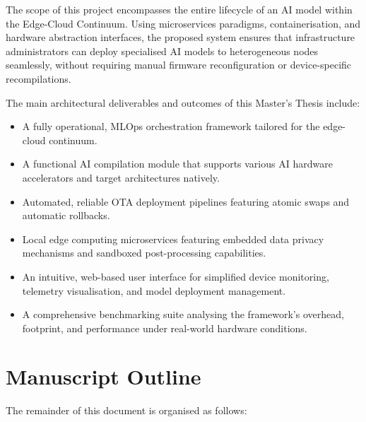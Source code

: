 The scope of this project encompasses the entire lifecycle of an \gls{AI} model within the Edge-Cloud Continuum. Using microservices paradigms, containerisation, and hardware abstraction interfaces, the proposed system ensures that infrastructure administrators can deploy specialised \gls{AI} models to heterogeneous nodes seamlessly, without requiring manual firmware reconfiguration or device-specific recompilations.

The main architectural deliverables and outcomes of this Master's Thesis include:

\begin{itemize}
    \item A fully operational, \gls{MLOps} orchestration framework tailored for the edge-cloud continuum.
    \item A functional \gls{AI} compilation module that supports various \gls{AI} hardware accelerators and target architectures natively.
    \item Automated, reliable \gls{OTA} deployment pipelines featuring atomic swaps and automatic rollbacks.
    \item Local edge computing microservices featuring embedded data privacy mechanisms and sandboxed post-processing capabilities.
    \item An intuitive, web-based user interface for simplified device monitoring, telemetry visualisation, and model deployment management.
    \item A comprehensive benchmarking suite analysing the framework's overhead, footprint, and performance under real-world hardware conditions.
\end{itemize}

\section{Manuscript Outline}\label{sec:int:outline}

The remainder of this document is organised as follows:

